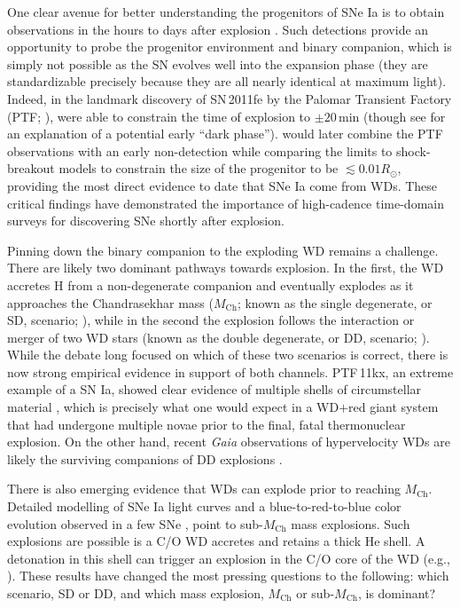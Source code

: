 \documentclass[twocolumn]{./aastex63}
\begin{document}
One clear avenue for better understanding the progenitors of SNe Ia is to obtain
observations in the hours to days after explosion \citep{Maoz14}. Such
detections provide an opportunity to probe the progenitor environment and binary
companion, which is simply not possible as the SN evolves well into the
expansion phase (they are standardizable precisely because they are all nearly
identical at maximum light). Indeed, in the landmark discovery of SN\,2011fe by
the Palomar Transient Factory (PTF; \citealt{law09,rau09}), \citet{Nugent11}
were able to constrain the time of explosion to $\pm 20$\,min (though see
\citealt{Piro13} for an explanation of a potential early ``dark phase'').
\citet{Bloom12a} would later combine the PTF observations with an early
non-detection while comparing the limits to shock-breakout models to constrain
the size of the progenitor to be $\lesssim 0.01 R_\odot$, providing the most
direct evidence to date that SNe Ia come from WDs. These critical findings have
demonstrated the importance of high-cadence time-domain surveys for discovering
SNe shortly after explosion.

Pinning down the binary companion to the exploding WD remains a challenge. There
are likely two dominant pathways towards explosion. In the first, the WD
accretes H from a non-degenerate companion and eventually explodes as it
approaches the Chandrasekhar mass ($M_\mathrm{Ch}$; known as the single
degenerate, or SD, scenario; \citealt{Whelan73}), while in the second the
explosion follows the interaction or merger of two WD stars (known as the double
degenerate, or DD, scenario; \citealt{Webbink84}). While the debate long focused
on which of these two scenarios is correct, there is now strong empirical
evidence in support of both channels. PTF\,11kx, an extreme example of a SN Ia,
showed clear evidence of multiple shells of circumstellar material
\citep{Dilday12}, which is precisely what one would expect in a WD$+$red giant
system that had undergone multiple novae prior to the final, fatal thermonuclear
explosion. On the other hand, recent \textit{Gaia} observations of hypervelocity
WDs are likely the surviving companions of DD explosions \citep{Shen18}.

There is also emerging evidence that WDs can explode prior to reaching
$M_\mathrm{Ch}$. Detailed modelling of SNe Ia light curves \citep{Scalzo14a} and
a blue-to-red-to-blue color evolution observed in a few SNe
\citep{Jiang17,Polin19,De19}, point to sub-$M_\mathrm{Ch}$ mass explosions. Such
explosions are possible is a C/O WD accretes and retains a thick He shell. A
detonation in this shell can trigger an explosion in the C/O core of the WD
(e.g., \citealt{Nomoto82,Nomoto82a}). These results have changed the most
pressing questions to the following: which scenario, SD or DD, and which mass
explosion, $M_\mathrm{Ch}$ or sub-$M_\mathrm{Ch}$, is dominant?
\end{document}

